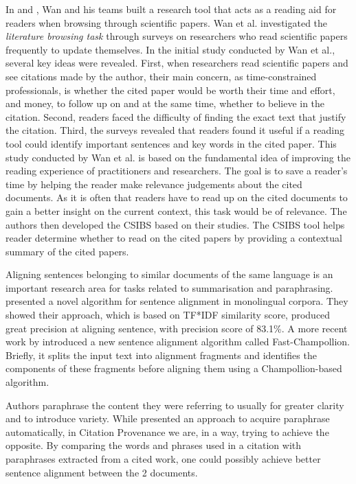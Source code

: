 In \cite{citation-sensitive} and \cite{csibs}, Wan and his teams built a research tool that acts as a reading aid for readers when browsing through scientific papers. Wan et al. investigated the \textit{literature browsing task} through surveys on researchers who read scientific papers frequently to update themselves. In the initial study conducted by Wan et al., several key ideas were revealed. First, when researchers read scientific papers and see citations made by the author, their main concern, as time-constrained professionals, is whether the cited paper would be worth their time and effort, and money, to follow up on and at the same time, whether to believe in the citation. Second, readers faced the difficulty of finding the exact text that justify the citation. Third, the surveys revealed that readers found it useful if a reading tool could identify important sentences and key words in the cited paper. This study conducted by Wan et al. is based on the fundamental idea of improving the reading experience of practitioners and researchers. The goal is to save a reader's time by helping the reader make relevance judgements about the cited documents. As it is often that readers have to read up on the cited documents to gain a better insight on the current context, this task would be of relevance. The authors then developed the CSIBS based on their studies. The CSIBS tool helps reader determine whether to read on the cited papers by providing a contextual summary of the cited papers.

Aligning sentences belonging to similar documents of the same language is an important research area for tasks related to summarisation and paraphrasing. \cite{nelken2006towards} presented a novel algorithm for sentence alignment in monolingual corpora. They showed their approach, which is based on TF*IDF similarity score, produced great precision at aligning sentence, with precision score of 83.1\%. A more recent work by \cite{li2010fast} introduced a new sentence alignment algorithm called Fast-Champollion. Briefly, it splits the input text into alignment fragments and identifies the components of these fragments before aligning them using a Champollion-based algorithm.

Authors paraphrase the content they were referring to usually for greater clarity and to introduce variety. While \cite{shinyama2002automatic} presented an approach to acquire paraphrase automatically, in Citation Provenance we are, in a way, trying to achieve the opposite. By comparing the words and phrases used in a citation with paraphrases extracted from a cited work, one could possibly achieve better sentence alignment between the 2 documents.